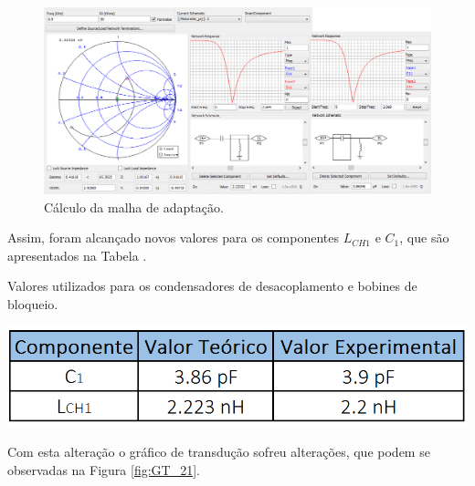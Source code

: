 \documentclass[11pt]{article}
\numberwithin{equation}{section}
\begin{document}
\begin{figure}[h]
\centering
\includegraphics[keepaspectratio=true, scale=0.45]{exps/M_adapt}
\vspace{-0.5em}
\caption{Cálculo da malha de adaptação.}
\vspace{-0.8em}
\label{fig:M_adapt}
\end{figure}

Assim, foram alcançado novos valores para os componentes $L_{CH1}$ e $C_{1}$, que são apresentados na Tabela .

\begin{table}[h]
	\centering
	\caption{Valores utilizados para os condensadores de desacoplamento e bobines de bloqueio.}
	\vspace{-1.5mm}
	\includegraphics[keepaspectratio=true, scale=0.40]{teoricas/componentes2}
\end{table}


Com esta alteração o gráfico de transdução sofreu alterações, que podem se observadas na Figura \ref{fig:GT_21}.
\end{document}
